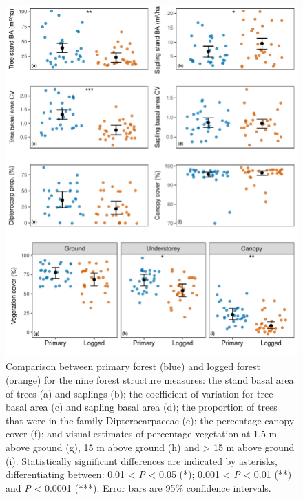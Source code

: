 \documentclass[12pt,a4paper,]{report}
\theoremstyle{definition}
\theoremstyle{definition}
\theoremstyle{definition}
\theoremstyle{remark}
\begin{document}
\begin{figure}[H]

{\centering \includegraphics{./output/fig-B-2-1} 

}

\caption{Comparison between primary forest (blue) and logged forest
(orange) for the nine forest structure measures: the stand basal area of
trees (a) and saplings (b); the coefficient of variation for tree basal
area (c) and sapling basal area (d); the proportion of trees that were
in the family Dipterocarpaceae (e); the percentage canopy cover (f); and
visual estimates of percentage vegetation at 1.5 m above ground (g), 15
m above ground (h) and \textgreater{} 15 m above ground (i).
Statistically significant differences are indicated by asterisks,
differentiating between: 0.01 \textless{} \emph{P} \textless{} 0.05 (*);
0.001 \textless{} \emph{P} \textless{} 0.01 (**) and \emph{P}
\textless{} 0.0001 (***). Error bars are 95\% confidence intervals.}\label{fig:fig-B-2}
\end{figure}

\clearpage
{}


\end{document}
